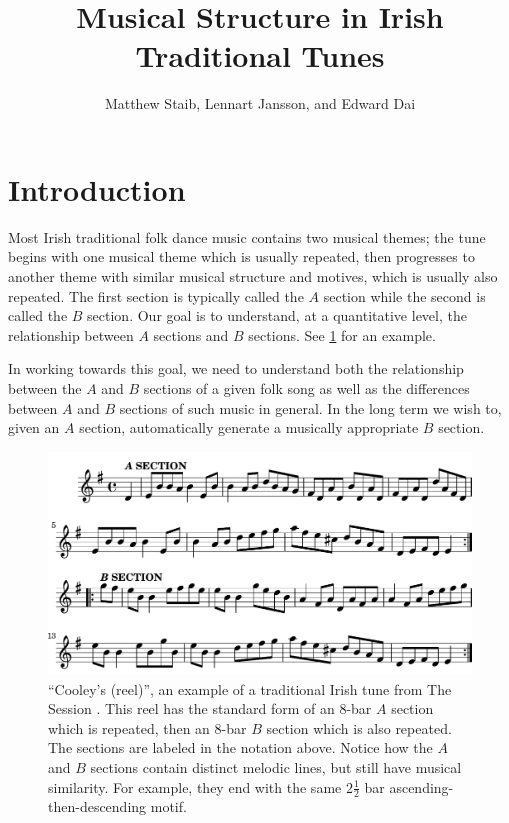 \documentclass{article} %
\title{Musical Structure in Irish Traditional Tunes}
\author{Matthew Staib, Lennart Jansson, and Edward Dai}
\begin{document}
\suppressfloats
\maketitle

\section{Introduction}
Most Irish traditional folk dance music contains two musical themes; the tune
begins with one musical theme which is usually repeated, then progresses to
another theme with similar musical structure and motives, which is usually also
repeated. The first section is typically called the $A$ section while the second
is called the $B$ section. Our goal is to understand, at a quantitative level,
the relationship between $A$ sections and $B$ sections. See \cref{origtune} for
an example.

In working towards this goal, we need to understand both the relationship
between the $A$ and $B$ sections of a given folk song as well as the differences
between $A$ and $B$ sections of such music in general. In the long term we wish
to, given an $A$ section, automatically generate a musically appropriate $B$
section.

\begin{figure}
  \centering \includegraphics[width=5in]{original_tune-crop.pdf}
  \caption{
    ``Cooley's (reel)'', an example of a traditional Irish tune from The
    Session \cite{thesession}. This reel has the standard form of an 8-bar $A$
    section which is repeated, then an 8-bar $B$ section which is also repeated.
    The sections are labeled in the notation above. Notice how the $A$ and $B$
    sections contain distinct melodic lines, but still have musical similarity.
    For example, they end with the same $2 \frac 1 2$ bar
    ascending-then-descending motif.
  }
  \label{origtune}
\end{figure}
\end{document}
